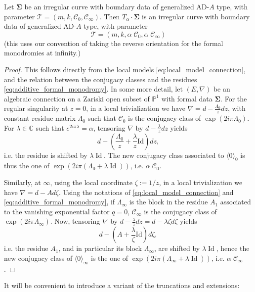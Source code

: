 \documentclass[11pt,a4paper]{amsart}
\numberwithin{equation}{section}
\DeclareMathOperator{\Id}{Id}
\newcommand{\cir}[1]{\langle #1 \rangle}
\begin{document}
\begin{lemma}
Let $\bm\Sigma$ be an irregular curve with boundary data of generalized AD-$A$ type, with parameter $\mathcal T=(m, k, \mathcal C_0, \mathcal C_\infty)$. Then $T_\alpha\cdot\bm\Sigma$ is an irregular curve with boundary data of generalized AD-$A$ type, with parameter 
\[
\mathcal T=(m, k, \alpha\;\mathcal C_0, \alpha\;\mathcal C_\infty)
\]
(this uses our convention of taking the reverse orientation for the formal monodromies at infinity.)
\end{lemma}

\begin{proof} This follows directly from the local models \eqref{eq:local_model_connection}, and the relation between the conjugacy classes and the residues \eqref{eq:additive_formal_monodromy}. In some more detail, let $(E,\nabla)$ be an algebraic connection on a Zariski open subset of $\mathbb P^1$ with formal data $\bm\Sigma$. For the regular singularity at $z=0$, in a local trivialization we have $\nabla=d-\frac{\Lambda_0}{z}dz$, with constant residue matrix $\Lambda_0$ such that $\mathcal C_0$ is the conjugacy class of $\exp(2i\pi\Lambda_0)$. For $\lambda\in \mathbb C$ such that $e^{2i\pi\lambda}=\alpha$, tensoring $\nabla$ by $d-\frac{\lambda}{z}dz$ yields 
\[
d-\left(\frac{\Lambda_0}{z}+\frac{\lambda}{z}\mathrm{Id}\right)dz, 
\]
i.e. the residue is shifted by $\lambda\Id$. The new conjugacy class associated to $\cir{0}_0$ is thus the one of $\exp(2i\pi(\Lambda_0+\lambda\Id))$, i.e. $\alpha\;\mathcal C_0$.

Similarly, at $\infty$, using the local coordinate $\zeta:=1/z$, in a local trivialization we have $\nabla=d-A d\zeta$. Using the notations of \eqref{eq:local_model_connection} and \eqref{eq:additive_formal_monodromy}, if $\Lambda_\infty$ is the block in the residue $A_1$ associated to the vanishing exponential factor $q=0$, $\mathcal C_\infty$ is the conjugacy class of $\exp(2i\pi\Lambda_\infty)$. Now, tensoring $\nabla$ by $d-\frac{\lambda}{z}dz=d-\lambda{\zeta}d\zeta$ yields
\[
d-\left(A+\frac{\lambda}{\zeta}\mathrm{Id}\right)d\zeta, 
\]
i.e. the residue $A_1$, and in particular its block $\Lambda_\infty$, are shifted by $\lambda\Id$, hence the new conjugacy class of $\cir{0}_\infty$ is the one of $\exp(2 i\pi(\Lambda_\infty+\lambda\Id))$, i.e. $\alpha\;\mathcal C_\infty$. 
\end{proof}


It will be convenient to introduce a variant of the truncations and extensions:
\end{document}
